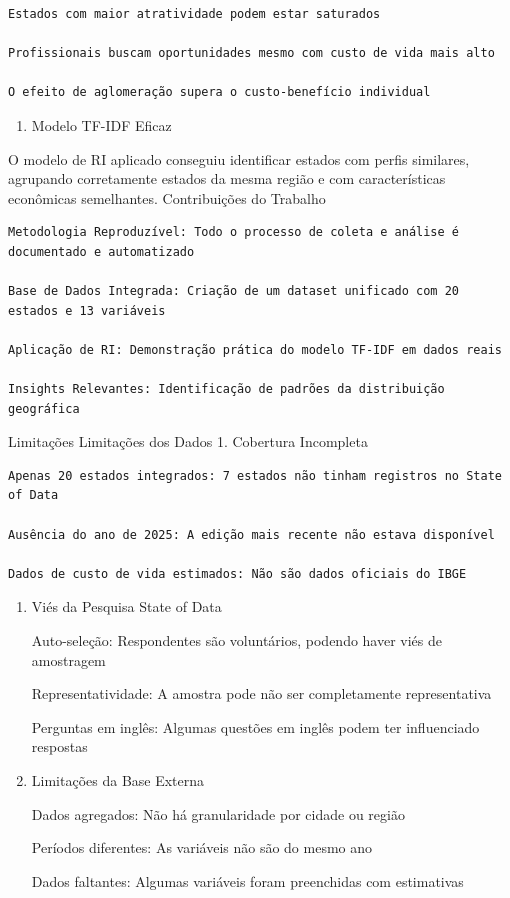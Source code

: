 \documentclass[
  11pt,
  letterpaper,
  DIV=11,
  numbers=noendperiod]{scrartcl}
\providecommand{\tightlist}{%
  \setlength{\itemsep}{0pt}\setlength{\parskip}{0pt}}
\begin{document}
\begin{verbatim}
Estados com maior atratividade podem estar saturados

Profissionais buscam oportunidades mesmo com custo de vida mais alto

O efeito de aglomeração supera o custo-benefício individual
\end{verbatim}

\begin{enumerate}
\def\labelenumi{\arabic{enumi}.}
\setcounter{enumi}{3}
\tightlist
\item
  Modelo TF-IDF Eficaz
\end{enumerate}

O modelo de RI aplicado conseguiu identificar estados com perfis
similares, agrupando corretamente estados da mesma região e com
características econômicas semelhantes. Contribuições do Trabalho

\begin{verbatim}
Metodologia Reproduzível: Todo o processo de coleta e análise é documentado e automatizado

Base de Dados Integrada: Criação de um dataset unificado com 20 estados e 13 variáveis

Aplicação de RI: Demonstração prática do modelo TF-IDF em dados reais

Insights Relevantes: Identificação de padrões da distribuição geográfica
\end{verbatim}

Limitações Limitações dos Dados 1. Cobertura Incompleta

\begin{verbatim}
Apenas 20 estados integrados: 7 estados não tinham registros no State of Data

Ausência do ano de 2025: A edição mais recente não estava disponível

Dados de custo de vida estimados: Não são dados oficiais do IBGE
\end{verbatim}

\begin{enumerate}
\def\labelenumi{\arabic{enumi}.}
\setcounter{enumi}{1}
\item
  Viés da Pesquisa State of Data

  Auto-seleção: Respondentes são voluntários, podendo haver viés de
  amostragem

  Representatividade: A amostra pode não ser completamente
  representativa

  Perguntas em inglês: Algumas questões em inglês podem ter influenciado
  respostas
\item
  Limitações da Base Externa

  Dados agregados: Não há granularidade por cidade ou região

  Períodos diferentes: As variáveis não são do mesmo ano

  Dados faltantes: Algumas variáveis foram preenchidas com estimativas
\end{enumerate}
\end{document}
